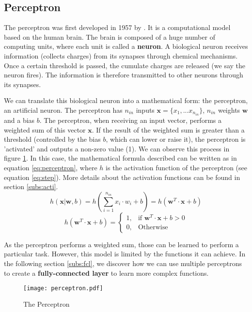 \subsection{Perceptron} \label{subs:perceptron}
The perceptron was first developed in 1957 by \textcite{brain_perceptron_nodate}. It is a computational model based on the human brain. The brain is composed of a huge number of computing units, where each unit is called a \textbf{neuron}. A biological neuron receives information (collects charges) from its synapses through chemical mechanisms. Once a certain threshold is passed, the cumulate charges are released (we say the neuron fires). The information is therefore transmitted to other neurons through its synapses.

We can translate this biological neuron into a mathematical form: the perceptron, an artificial neuron. The perceptron has $n_{in}$ inputs $\boldsymbol{x} = \{ x_1, ... x_{n_{in}} \}$, $n_{in}$ weights $\boldsymbol{w}$ and a bias $b$. The perceptron, when receiving an input vector, performs a weighted sum of this vector $\boldsymbol{x}$. If the result of the weighted sum is greater than a threshold (controlled by the bias $b$, which can lower or raise it), the perceptron is 'activated' and outputs a non-zero value (1). We can observe this process in figure \ref{fig:perceptron}.
In this case, the mathematical formula described can be written as in equation \ref{eq:perceptron}, where $h$ is the activation function of the perceptron (see equation \ref{eq:step}). More details about the activation functions can be found in section \ref{subs:acti}.
%
\begin{equation}
    h ( \boldsymbol{x} | \boldsymbol{w}, b) = h(\sum^{n_{in}}_{i=1} x_i \cdot w_i + b) = h ( \boldsymbol{w}^{T} \cdot \boldsymbol{x} + b)
    \label{eq:perceptron}
\end{equation}
%
\begin{equation}
    h ( \boldsymbol{w}^{T} \cdot \boldsymbol{x} + b) = \begin{cases} 1, & \mbox{if } \boldsymbol{w}^{T} \cdot \boldsymbol{x} + b > 0 \\ 0, & \mbox{Otherwise} \end{cases}
    \label{eq:step}
\end{equation}

As the perceptron performs a weighted sum, those can be learned to perform a particular task. However, this model is limited by the functions it can achieve. In the following section \ref{subs:fcl}, we discover how we can use multiple perceptrons to create a \textbf{fully-connected layer} to learn more complex functions.
%
\begin{figure}
    \centering
    \texttt{[image: perceptron.pdf]}
    \caption{The Perceptron}
    \label{fig:perceptron}
\end{figure}
